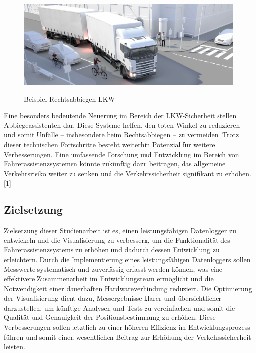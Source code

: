 \documentclass[a4paper, 12pt]{article} %
\begin{document}
\begin{figure}[H]
    \includegraphics[width=1\linewidth]{images/abbiegeassistent-scaled-7b2478b8}\\[1ex]
    \centering
    \caption{Beispiel Rechtsabbiegen LKW}
    \label{ABBILDUNG}
\end{figure}


Eine besonders bedeutende Neuerung im Bereich der \acf{LKW}-Sicherheit stellen Abbiegeassistenten dar. 
Diese Systeme helfen, den toten Winkel zu reduzieren und somit Unfälle – insbesondere beim Rechtsabbiegen – zu vermeiden. 
Trotz dieser technischen Fortschritte besteht weiterhin Potenzial für weitere Verbesserungen. Eine umfassende Forschung und Entwicklung 
im Bereich von Fahrerassistenzsystemen könnte zukünftig dazu beitragen, das allgemeine Verkehrsrisiko weiter zu senken und die Verkehrssicherheit
signifikant zu erhöhen. [1]

\clearpage

\subsection{Zielsetzung}
Zielsetzung dieser Studienarbeit ist es, einen 
leistungsfähigen Datenlogger zu entwickeln und die Visualisierung 
zu verbessern, um die Funktionalität des Fahrerassistenzsystems zu erhöhen 
und dadurch dessen Entwicklung zu erleichtern. Durch die Implementierung eines 
leistungsfähigen Datenloggers sollen Messwerte systematisch und zuverlässig 
erfasst werden können, was eine effektivere Zusammenarbeit im Entwicklungsteam 
ermöglicht und die Notwendigkeit einer dauerhaften Hardwareverbindung reduziert. Die Optimierung der Visualisierung 
dient dazu, Messergebnisse klarer und übersichtlicher darzustellen, um künftige Analysen und Tests zu vereinfachen und somit
 die Qualität und Genauigkeit der Positionsbestimmung zu erhöhen. Diese Verbesserungen sollen letztlich zu einer höheren Effizienz
  im Entwicklungsprozess führen und 
somit einen wesentlichen Beitrag zur Erhöhung der Verkehrssicherheit leisten.
\end{document}
